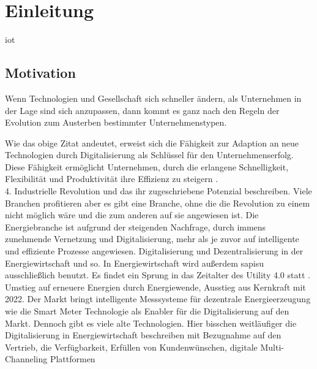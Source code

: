\section{Einleitung}

\ac{iot}

\subsection{Motivation}

\begin{displayquote}
  \glqq Wenn Technologien und Gesellschaft sich schneller ändern, als Unternehmen in der Lage sind sich anzupassen, dann kommt es ganz nach den Regeln der Evolution zum Austerben bestimmter Unternehmenstypen.\grqq{} 
\end{displayquote}

\begin{flushright}
  \citet[S. 3, zitiert nach Land, K.-H. 2015]{Roth2016}
\end{flushright}

Wie das obige Zitat andeutet, erweist sich die Fähigkeit zur Adaption an neue Technologien durch Digitalisierung als Schlüssel für den Unternehmenserfolg. Diese Fähigkeit ermöglicht Unternehmen, durch die erlangene Schnelligkeit, Flexibilität und Produktivität ihre Effizienz zu steigern \citep{Roth2016}.
\\4. Industrielle Revolution und das ihr zugeschriebene Potenzial beschreiben. Viele Branchen profitieren aber es gibt eine Branche,
ohne die die Revolution zu einem nicht möglich wäre und die zum anderen auf sie angewiesen ist.
Die Energiebranche ist aufgrund der steigenden Nachfrage, durch immens zunehmende Vernetzung und Digitalisierung, mehr als je zuvor auf intelligente und effiziente Prozesse angewiesen.
Digitalisierung und Dezentralisierung in der Energiewirtschaft und so. In Energiewirtschaft wird außerdem \ac{sapisu} ausschließlich benutzt.
Es findet ein Sprung in das Zeitalter des \glqq Utility 4.0\grqq{} statt \citep{Doleski2017}.
Umstieg auf erneuere Energien durch Energiewende, Ausstieg aus Kernkraft mit 2022. Der Markt bringt intelligente Messsysteme für dezentrale Energieerzeugung wie die Smart Meter Technologie als Enabler für
die Digitalisierung auf den Markt. Dennoch gibt es viele alte Technologien.
Hier bisschen weitläufiger die Digitalisierung in Energiewirtschaft beschreiben mit Bezugnahme auf den Vertrieb,
die Verfügbarkeit, Erfüllen von Kundenwünschen, digitale Multi-Channeling Plattformen

